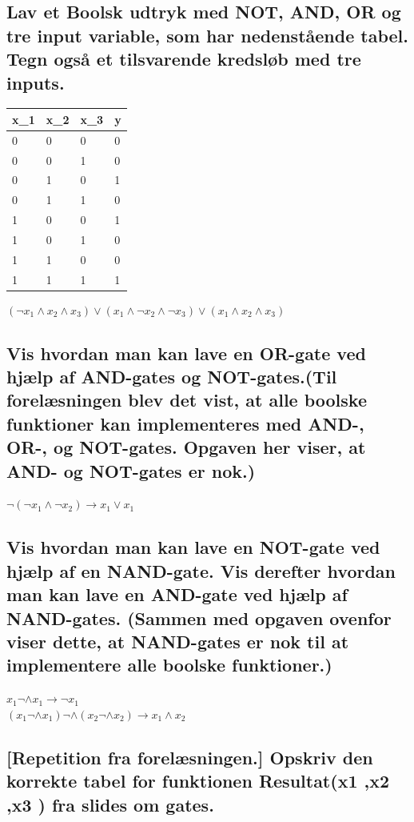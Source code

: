 \documentclass[12pt, a4paper]{article}
\begin{document}
					\subsection{Lav et Boolsk udtryk med NOT, AND, OR og tre input variable, som har nedenstående tabel. Tegn også et tilsvarende kredsløb med tre inputs.}
						\begin{table}[h!]
						\begin{tabular}{|l|l|l|l|}
						\hline
						x\_1 & x\_2 & x\_3 & y \\ \hline
						0    & 0    & 0    & 0 \\ \hline
						0    & 0    & 1    & 0 \\ \hline
						0    & 1    & 0    & 1 \\ \hline
						0    & 1    & 1    & 0 \\ \hline
						1    & 0    & 0    & 1 \\ \hline
						1    & 0    & 1    & 0 \\ \hline
						1    & 1    & 0    & 0 \\ \hline
						1    & 1    & 1    & 1 \\ \hline
						\end{tabular}
						\end{table}
						$(\neg x_1\land x_2\land x_3)\lor ( x_1\land\neg x_2\land\neg x_3)\lor ( x_1\land x_2\land x_3)$
					\subsection{Vis hvordan man kan lave en OR-gate ved hjælp af AND-gates og
NOT-gates.(Til forelæsningen blev det vist, at alle boolske funktioner kan implementeres med AND-, OR-, og NOT-gates. Opgaven her viser, at AND- og NOT-gates er nok.)}
						$\neg(\neg x_1 \land \neg x_2)\rightarrow x_1\lor x_1$\\
						\subsection{Vis hvordan man kan lave en NOT-gate ved hjælp af en NAND-gate. Vis derefter hvordan man kan lave en AND-gate ved hjælp af NAND-gates. (Sammen med opgaven ovenfor viser dette, at NAND-gates er nok til at implementere alle boolske funktioner.)}
							$x_1\neg\land x_1\rightarrow \neg x_1$\\
							$(x_1\neg\land x_1)\neg\land(x_2\neg\land x_2)\rightarrow x_1\land x_2$\\
					\subsection{[Repetition fra forelæsningen.] Opskriv den korrekte tabel for funktionen Resultat(x1 ,x2 ,x3 ) fra slides om gates.}
						
\end{document}
